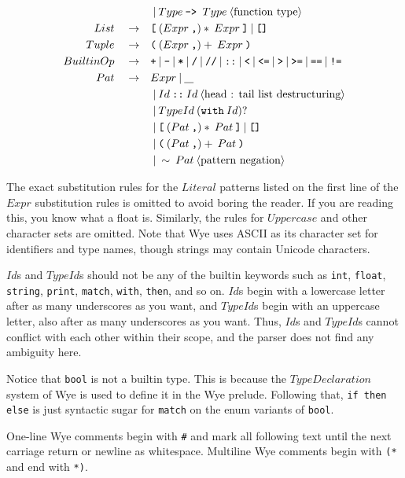 \documentclass[a4paper, 12pt]{article}
\newcommand{\sepbar}{\: | \:}	%
\newcommand{\substo}{\quad\rightarrow\quad}
\newcommand{\uscore}{\underline{\hspace{0.3cm}}}
\begin{document}
\begin{align*}
& \sepbar Type \: \texttt{-> }Type\:\langle\text{function type}\rangle\\
List \substo& \texttt{[}\: (Expr \: \texttt{,})*\: Expr\: \texttt{]} \sepbar \texttt{[]}\\
Tuple \substo& \texttt{(}\: (Expr \: \texttt{,})+\: Expr\: \texttt{)}\\
BuiltinOp \substo& \texttt{+}\sepbar\texttt{-}\sepbar\texttt{*}\sepbar\texttt{/}\sepbar\texttt{//}\sepbar\texttt{::}\sepbar\texttt{<}\sepbar\texttt{<=}\sepbar\texttt{>}\sepbar\texttt{>=}\sepbar\texttt{==}\sepbar\texttt{!=}\\
Pat \substo& Expr \sepbar \uscore\\
& \sepbar Id\:\texttt{::}\: Id\:\langle\text{head : tail list destructuring}\rangle\\
& \sepbar TypeId \: (\texttt{with}\: Id)?\\
& \sepbar \texttt{[} \: ( Pat\:\texttt{,})*\: Pat \: \texttt{]} \sepbar  \texttt{[]}\\
& \sepbar \texttt{(} \: ( Pat\:\texttt{,})+\: Pat\: \texttt{)}\\
& \sepbar \sim\:Pat \:\langle\text{pattern negation}\rangle
\end{align*}
\pagebreak

The exact substitution rules for the $Literal$ patterns listed on the first line of the $Expr$ substitution rules is omitted to avoid boring the reader. If you are reading this, you know what a float is. Similarly, the rules for $Uppercase$ and other character sets are omitted. Note that Wye uses ASCII as its character set for identifiers and type names, though strings may contain Unicode characters.

$Id$s and $TypeId$s should not be any of the builtin keywords such as \texttt{int}, \texttt{float}, \texttt{string}, \texttt{print}, \texttt{match}, \texttt{with}, \texttt{then}, and so on. $Id$s begin with a lowercase letter after as many underscores as you want, and $TypeId$s begin with an uppercase letter, also after as many underscores as you want. Thus, $Id$s and $TypeId$s cannot conflict with each other within their scope, and the parser does not find any ambiguity here.

Notice that \texttt{bool} is not a builtin type. This is because the $TypeDeclaration$ system of Wye is used to define it in the Wye prelude. Following that, \texttt{if then else} is just syntactic sugar for \texttt{match} on the enum variants of \texttt{bool}.

One-line Wye comments begin with \texttt{\#} and mark all following text until the next carriage return or newline as whitespace. Multiline Wye comments begin with \texttt{(*} and end with \texttt{*)}.
\end{document}
